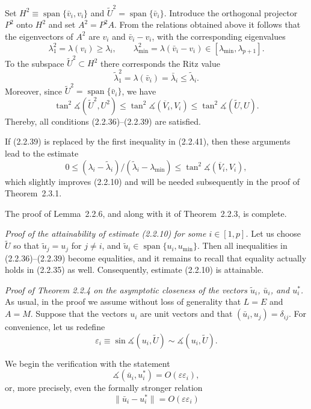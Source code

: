 \documentclass[11pt,oneside]{book}
\newcommand{\myspan}{\operatorname{span}}
\newcommand{\ang}{\measuredangle}
\begin{document}
Set $H^2 \equiv \myspan\{\bar{v}_i, v_i\}$ and $\widetilde{U}^2 = \myspan\{\bar{v}_i\}$. Introduce the orthogonal projector $P^2$ onto $H^2$ and set $A^2 = P^2 A$. From the relations obtained above it follows that the eigenvectors of $A^2$ are $v_i$ and $\bar{v}_i - v_i$, with the corresponding eigenvalues
\[
\lambda_1^2 = \lambda(v_i) \geqslant \lambda_i, \qquad \lambda_{\min}^2 = \lambda(\bar{v}_i - v_i) \in [\lambda_{\min}, \lambda_{p+1}].
\]
To the subspace $\widetilde{U}^2 \subset H^2$ there corresponds the Ritz value
\[
\tilde{\lambda}_1^2 = \lambda(\bar{v}_i) = \bar{\lambda}_i \leqslant \tilde{\lambda}_i.
\]
Moreover, since $\widetilde{U}^2 = \myspan\{\bar{v}_i\}$, we have
\[
\tan^2 \ang(\widetilde{U}^2, U^2) \leqslant \tan^2 \ang(\overline{V}_i, V_i) \leqslant \tan^2 \ang(\widetilde{U}, U). \tag{2.2.41}
\]
Thereby, all conditions (2.2.36)--(2.2.39) are satisfied.

If (2.2.39) is replaced by the first inequality in (2.2.41), then these arguments lead to the estimate
\[
0 \leqslant (\lambda_i - \tilde{\lambda}_i) / (\tilde{\lambda}_i - \lambda_{\min}) \leqslant \tan^2 \ang(\overline{V}_i, V_i), \tag{2.2.42}
\]
which slightly improves (2.2.10) and will be needed subsequently in the proof of Theorem~2.3.1.

The proof of Lemma~2.2.6, and along with it of Theorem~2.2.3, is complete.

\textit{Proof of the attainability of estimate (2.2.10) for some $i \in [1, p]$.} Let us choose $\widetilde{U}$ so that $\tilde{u}_j = u_j$ for $j \neq i$, and $\tilde{u}_i \in \myspan\{u_i, u_{\min}\}$. Then all inequalities in (2.2.36)--(2.2.39) become equalities, and it remains to recall that equality actually holds in (2.2.35) as well. Consequently, estimate (2.2.10) is attainable.

\textit{Proof of Theorem 2.2.4 on the asymptotic closeness of the vectors $\tilde{u}_i$, $\bar{u}_i$, and $u_i^*$.} As usual, in the proof we assume without loss of generality that $L = E$ and $A = M$. Suppose that the vectors $u_i$ are unit vectors and that $(\bar{u}_i, u_j) = \delta_{ij}$. For
convenience, let us redefine
\[
\varepsilon_i \equiv \sin \ang(u_i, \widetilde{U}) \sim \ang(u_i, \widetilde{U}).
\]

We begin the verification with the statement
\[
\ang(\bar{u}_i, u_i^*) = O(\varepsilon \varepsilon_i),
\]
or, more precisely, even the formally stronger relation
\[
\|\bar{u}_i - u_i^*\| = O(\varepsilon \varepsilon_i) \tag{2.2.43}
\]
\end{document}
